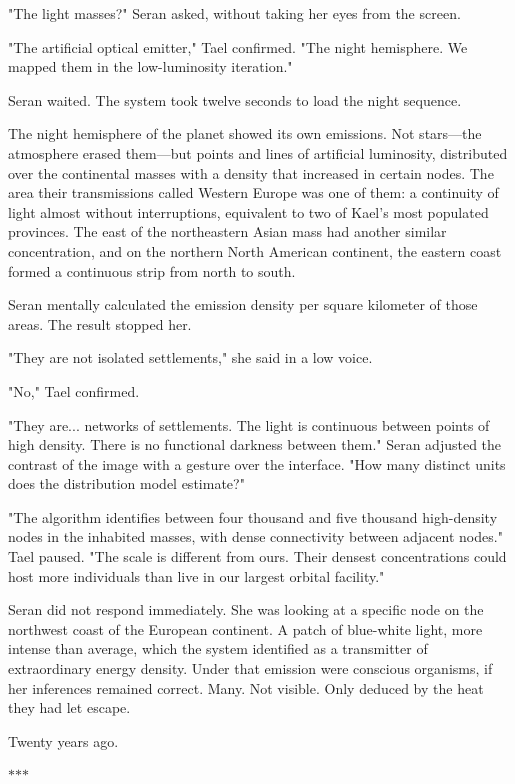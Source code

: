 \documentclass[11pt,a5paper,twoside]{book}
\begin{document}
"The light masses?" Seran asked, without taking her eyes from the screen.

"The artificial optical emitter," Tael confirmed. "The night hemisphere. We mapped them in the low-luminosity iteration."

Seran waited. The system took twelve seconds to load the night sequence.

The night hemisphere of the planet showed its own emissions. Not stars—the atmosphere erased them—but points and lines of artificial luminosity, distributed over the continental masses with a density that increased in certain nodes. The area their transmissions called Western Europe was one of them: a continuity of light almost without interruptions, equivalent to two of Kael's most populated provinces. The east of the northeastern Asian mass had another similar concentration, and on the northern North American continent, the eastern coast formed a continuous strip from north to south.

Seran mentally calculated the emission density per square kilometer of those areas. The result stopped her.

"They are not isolated settlements," she said in a low voice.

"No," Tael confirmed.

"They are... networks of settlements. The light is continuous between points of high density. There is no functional darkness between them." Seran adjusted the contrast of the image with a gesture over the interface. "How many distinct units does the distribution model estimate?"

"The algorithm identifies between four thousand and five thousand high-density nodes in the inhabited masses, with dense connectivity between adjacent nodes." Tael paused. "The scale is different from ours. Their densest concentrations could host more individuals than live in our largest orbital facility."

Seran did not respond immediately. She was looking at a specific node on the northwest coast of the European continent. A patch of blue-white light, more intense than average, which the system identified as a transmitter of extraordinary energy density. Under that emission were conscious organisms, if her inferences remained correct. Many. Not visible. Only deduced by the heat they had let escape.

Twenty years ago.

\vspace{1.5em}
\begin{center}$\ast$\quad$\ast$\quad$\ast$\end{center}
\vspace{1.5em}
\end{document}
